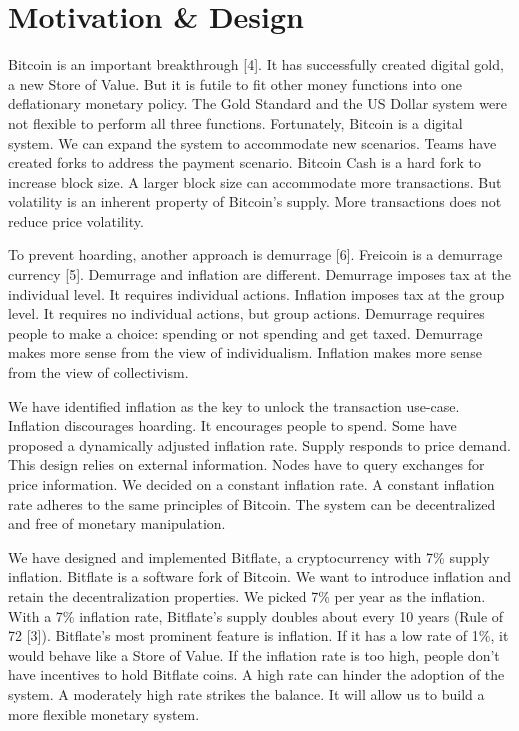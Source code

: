 \documentclass{article}      %
\begin{document}
\section{Motivation \& Design}

Bitcoin is an important breakthrough [4]. It has successfully created digital gold, a new Store of Value. But it is futile to fit other money functions into one deflationary monetary policy. The Gold Standard and the US Dollar system were not flexible to perform all three functions. Fortunately, Bitcoin is a digital system. We can expand the system to accommodate new scenarios. Teams have created forks to address the payment scenario. Bitcoin Cash is a hard fork to increase block size. A larger block size can accommodate more transactions. But volatility is an inherent property of Bitcoin's supply. More transactions does not reduce price volatility.

To prevent hoarding, another approach is demurrage [6]. Freicoin is a demurrage currency [5]. Demurrage and inflation are different. Demurrage imposes tax at the individual level. It requires individual actions. Inflation imposes tax at the group level. It requires no individual actions, but group actions. Demurrage requires people to make a choice: spending or not spending and get taxed. Demurrage makes more sense from the view of individualism. Inflation makes more sense from the view of collectivism.

We have identified inflation as the key to unlock the transaction use-case. Inflation discourages hoarding. It encourages people to spend. Some have proposed a dynamically adjusted inflation rate. Supply responds to price demand. This design relies on external information. Nodes have to query exchanges for price information. We decided on a constant inflation rate. A constant inflation rate adheres to the same principles of Bitcoin. The system can be decentralized and free of monetary manipulation.

We have designed and implemented Bitflate, a cryptocurrency with 7\% supply inflation. Bitflate is a software fork of Bitcoin. We want to introduce inflation and retain the decentralization properties. We picked 7\% per year as the inflation. With a 7\% inflation rate, Bitflate's supply doubles about every 10 years (Rule of 72 [3]). Bitflate's most prominent feature is inflation. If it has a low rate of 1\%, it would behave like a Store of Value. If the inflation rate is too high, people don't have incentives to hold Bitflate coins. A high rate can hinder the adoption of the system. A moderately high rate strikes the balance. It will allow us to build a more flexible monetary system.
\end{document}
